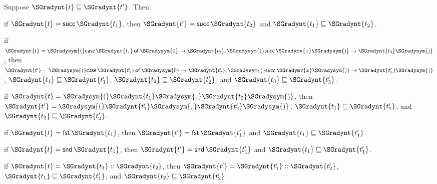 \begin{lemma}
  \label{lemma:inversion_of_term_precision}
  Suppose $ \SGradynt{t}  \sqsubseteq  \SGradynt{t'} $. Then:
  \begin{enumR}
  \item if $\SGradynt{t} = \mathsf{succ} \, \SGradynt{t_{{\mathrm{1}}}}$, then $\SGradynt{t'} = \mathsf{succ} \, \SGradynt{t_{{\mathrm{2}}}}$ and $ \SGradynt{t_{{\mathrm{1}}}}  \sqsubseteq  \SGradynt{t_{{\mathrm{2}}}} $.
  \item if $\SGradynt{t} = \SGradysym{(}   \mathsf{case}\, \SGradynt{t_{{\mathrm{1}}}} \,\mathsf{of}\, \SGradysym{0}  \to  \SGradynt{t_{{\mathrm{2}}}} ,  \SGradysym{(}  \mathsf{succ} \, \SGradymv{x}  \SGradysym{)}  \to  \SGradynt{t_{{\mathrm{3}}}}   \SGradysym{)}$, then
    $\SGradynt{t'} = \SGradysym{(}   \mathsf{case}\, \SGradynt{t'_{{\mathrm{1}}}} \,\mathsf{of}\, \SGradysym{0}  \to  \SGradynt{t'_{{\mathrm{2}}}} ,  \SGradysym{(}  \mathsf{succ} \, \SGradymv{x}  \SGradysym{)}  \to  \SGradynt{t'_{{\mathrm{3}}}}   \SGradysym{)}$, $ \SGradynt{t_{{\mathrm{1}}}}  \sqsubseteq  \SGradynt{t'_{{\mathrm{1}}}} $, $ \SGradynt{t_{{\mathrm{2}}}}  \sqsubseteq  \SGradynt{t'_{{\mathrm{2}}}} $, and $ \SGradynt{t_{{\mathrm{3}}}}  \sqsubseteq  \SGradynt{t'_{{\mathrm{3}}}} $.
  \item if $\SGradynt{t} = \SGradysym{(}  \SGradynt{t_{{\mathrm{1}}}}  \SGradysym{,}  \SGradynt{t_{{\mathrm{2}}}}  \SGradysym{)}$, then $\SGradynt{t'} = \SGradysym{(}  \SGradynt{t'_{{\mathrm{1}}}}  \SGradysym{,}  \SGradynt{t'_{{\mathrm{2}}}}  \SGradysym{)}$, $ \SGradynt{t_{{\mathrm{1}}}}  \sqsubseteq  \SGradynt{t'_{{\mathrm{1}}}} $, and $ \SGradynt{t_{{\mathrm{2}}}}  \sqsubseteq  \SGradynt{t'_{{\mathrm{2}}}} $.
  \item if $\SGradynt{t} = \mathsf{fst} \, \SGradynt{t_{{\mathrm{1}}}}$, then $\SGradynt{t'} = \mathsf{fst} \, \SGradynt{t'_{{\mathrm{1}}}}$ and $ \SGradynt{t_{{\mathrm{1}}}}  \sqsubseteq  \SGradynt{t'_{{\mathrm{1}}}} $.
  \item if $\SGradynt{t} = \mathsf{snd} \, \SGradynt{t_{{\mathrm{1}}}}$, then $\SGradynt{t'} = \mathsf{snd} \, \SGradynt{t'_{{\mathrm{1}}}}$ and $ \SGradynt{t_{{\mathrm{1}}}}  \sqsubseteq  \SGradynt{t'_{{\mathrm{1}}}} $.
  \item if $\SGradynt{t} =  \SGradynt{t_{{\mathrm{1}}}}  ::  \SGradynt{t_{{\mathrm{2}}}} $, then $\SGradynt{t'} =  \SGradynt{t'_{{\mathrm{1}}}}  ::  \SGradynt{t'_{{\mathrm{2}}}} $, $ \SGradynt{t_{{\mathrm{1}}}}  \sqsubseteq  \SGradynt{t'_{{\mathrm{1}}}} $, and $ \SGradynt{t_{{\mathrm{2}}}}  \sqsubseteq  \SGradynt{t'_{{\mathrm{2}}}} $.

\end{enumR}
\end{lemma}
